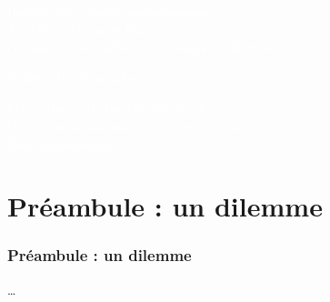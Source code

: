 \documentclass[xcolor=table]{beamer}
\title{}
\date{}
\begin{document}
\begin{frame}[plain]


\begin{center}
\textcolor{white}{\Large{Histoire des sciences contemporaines} \\ \bigskip \large{ Au delà de Galois et Poincaré :  \\
créations individuelles et dynamiques collectives}}

\bigskip


\bigskip
\textcolor{white}{\large {Frédéric Brechenmacher}} 

\bigskip
\textcolor{white}{\small{Laboratoire interdisciplinaire de l'X \\ \bigskip Département humanités et sciences sociales \\ École polytechnique}}

\end{center}

\end{frame}



\section{Préambule : un dilemme}
\begin{frame}
\frametitle{Préambule : un dilemme}

\pause
…
\end{frame}
\end{document}
